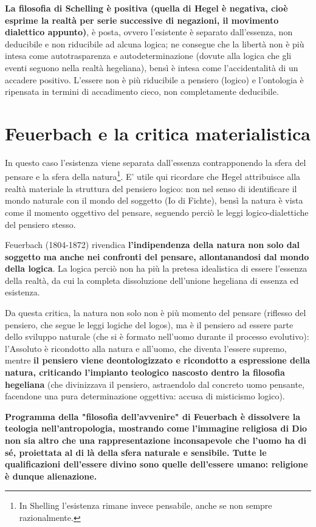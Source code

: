 \textbf{La filosofia di Schelling è positiva (quella di Hegel è negativa, cioè esprime la realtà per serie successive di negazioni, il movimento dialettico appunto)}, è posta, ovvero l'esistente è separato dall'essenza, non deducibile e non riducibile ad alcuna logica; ne consegue che la libertà non è più intesa come autotrasparenza e autodeterminazione (dovute alla logica che gli eventi seguono nella realtà hegeliana), bensì è intesa come l'accidentalità di un accadere positivo. L'essere non è più riducibile a pensiero (logico) e l'ontologia è ripensata in termini di accadimento cieco, non completamente deducibile.

\section{Feuerbach e la critica materialistica}

In questo caso l'esistenza viene separata dall'essenza contrapponendo la sfera del pensare e la sfera della natura\footnote{In Shelling l'esistenza rimane invece pensabile, anche se non sempre razionalmente.}. E' utile qui ricordare che Hegel attribuisce alla realtà materiale la struttura del pensiero logico: non nel senso di identificare il mondo naturale con il mondo del soggetto (Io di Fichte), bensì la natura è vista come il momento oggettivo del pensare, seguendo perciò le leggi logico-dialettiche del pensiero stesso.

Feuerbach (1804-1872) rivendica \textbf{l'indipendenza della natura non solo dal soggetto ma anche nei confronti del pensare, allontanandosi dal mondo della logica}. La logica perciò non ha più la pretesa idealistica di essere l'essenza della realtà, da cui la completa dissoluzione dell'unione hegeliana  di essenza ed esistenza.

Da questa critica, la natura non solo non è più momento del pensare (riflesso del pensiero, che segue le leggi logiche del logos), ma è il pensiero ad essere parte dello sviluppo naturale (che si è formato nell'uomo durante il processo evolutivo): l'Assoluto è ricondotto alla natura e all'uomo, che diventa l'essere supremo, mentre \textbf{il pensiero viene deontologizzato  e ricondotto a espressione della natura, criticando l'impianto teologico nascosto dentro la filosofia hegeliana }(che divinizzava il pensiero, astraendolo dal concreto uomo pensante, facendone una pura determinazione oggettiva: accusa di misticismo logico).

\textbf{Programma della "filosofia dell'avvenire" di Feuerbach  è dissolvere la teologia nell'antropologia, mostrando come l'immagine religiosa di Dio non sia altro che una rappresentazione inconsapevole che l'uomo ha di sé, proiettata al di là della sfera naturale e sensibile. Tutte le qualificazioni dell'essere divino sono quelle dell'essere umano: religione è dunque alienazione.}


